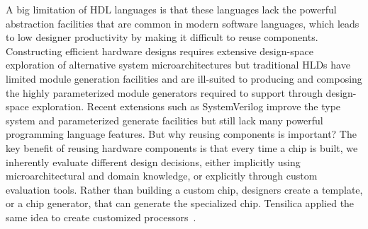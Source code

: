 A big limitation of HDL languages is that these languages lack the powerful abstraction facilities that
are common in modern software languages, which leads to low designer productivity by making it difficult to reuse components.
Constructing efficient hardware designs requires extensive design-space exploration of alternative system microarchitectures but traditional HLDs have limited module generation facilities and are ill-suited to producing and composing the highly parameterized module generators required to support through design-space exploration.
Recent extensions such as SystemVerilog improve the type system and parameterized generate facilities but still lack many powerful programming language features.
But why reusing components is important?
The key benefit of reusing hardware components is that every time a chip is built, we inherently evaluate different design decisions, either implicitly using microarchitectural and domain knowledge, or explicitly through custom evaluation tools.
Rather than building a custom chip, designers create a template, or a chip generator, that can generate the specialized chip. Tensilica applied the same idea to create customized processors~\cite{tensillica}.


        
        
    
                    
